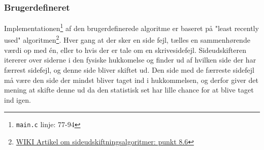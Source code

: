\subsubsection{Brugerdefineret}
Implementationen\footnote{\texttt{main.c} linje: 77-94} af den brugerdefinerede algoritme er baseret på "least recently used" algoritmen\footnote{\href{https://en.wikipedia.org/wiki/Page_replacement_algorithm}{WIKI Artikel om sideudskiftningsalgoritmer: punkt 8.6}}. Hver gang at der sker en side fejl, tælles en sammenhørende værdi op med én, eller to hvis der er tale om en skrivesidefejl. Sideudskifteren itererer over siderne i den fysiske hukkomelse og finder ud af hvilken side der har færrest sidefejl, og denne side bliver skiftet ud. Den side med de færreste sidefejl må være den side der mindst bliver taget ind i hukkommelsen, og derfor giver det mening at skifte denne ud da den statistisk set har lille chance for at blive taget ind igen.
